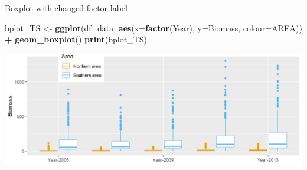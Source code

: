 \documentclass[
  ignorenonframetext,
]{beamer}
\newenvironment{Shaded}{\begin{snugshade}}{\end{snugshade}}
\newcommand{\DataTypeTok}[1]{\textcolor[rgb]{0.13,0.29,0.53}{#1}}
\newcommand{\KeywordTok}[1]{\textcolor[rgb]{0.13,0.29,0.53}{\textbf{#1}}}
\newcommand{\NormalTok}[1]{#1}
\newcommand{\OperatorTok}[1]{\textcolor[rgb]{0.81,0.36,0.00}{\textbf{#1}}}
\newcommand{\StringTok}[1]{\textcolor[rgb]{0.31,0.60,0.02}{#1}}
\begin{document}
\begin{frame}[fragile]{Boxplot with changed factor label}
\protect\hypertarget{boxplot-with-changed-factor-label}{}

\begin{Shaded}
\begin{Highlighting}[]
\NormalTok{bplot_TS <-}\StringTok{ }\KeywordTok{ggplot}\NormalTok{(df_data, }\KeywordTok{aes}\NormalTok{(}\DataTypeTok{x=}\KeywordTok{factor}\NormalTok{(Year), }\DataTypeTok{y=}\NormalTok{Biomass, }\DataTypeTok{colour=}\NormalTok{AREA)) }\OperatorTok{+}
\StringTok{  }\KeywordTok{geom_boxplot}\NormalTok{()}
\KeywordTok{print}\NormalTok{(bplot_TS)}
\end{Highlighting}
\end{Shaded}

\begin{center}\includegraphics[width=0.8\linewidth]{figure/boxplot_TSf_AREA_final-1} \end{center}

\end{frame}
\end{document}
